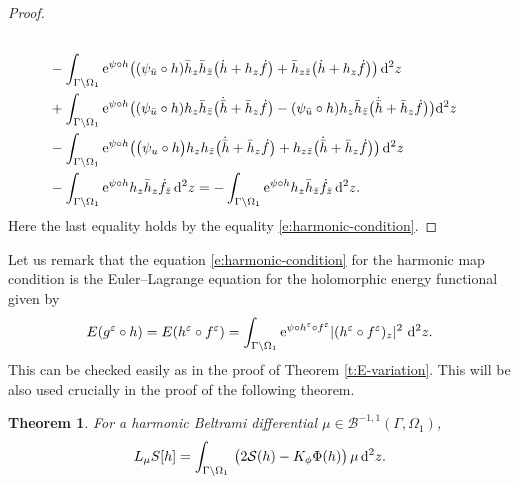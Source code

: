 \documentclass[pdftex]{sigma}%
\numberwithin{equation}{section}
\newtheorem{Theorem}{Theorem}[section]
\newcommand{\vep}{\varepsilon}
\begin{document}
\begin{proof}
\begin{align*}
\\
&-\int_{\Gamma\backslash \Omega_1}{\rm e}^{\psi\circ h} \big((\psi_{\bar{u}}\circ h) \bar{h}_z \bar{h}_{\bar{z}} \big(\dot{h}+h_z \dot{f} \big) + \bar{h}_{z\bar{z}} \big(\dot{h} +h_{z} \dot{f}\big)\big)\, {\rm d}^2z
\\
&+ \int_{\Gamma\backslash \Omega_1} {\rm e}^{\psi\circ h} \big( (\psi_{\bar{u}}\circ h)h_z \bar{h}_{\bar{z}} \big(\dot{\bar{h}}+\bar{h}_z \dot{f} \big) - (\psi_{\bar{u}}\circ h)h_z \bar{h}_{\bar{z}} \big(\dot{\bar{h}}+\bar{h}_z \dot{f} \big) \big) {\rm d}^2z
\\
&-\int_{\Gamma\backslash \Omega_1} {\rm e}^{\psi\circ h} \big( \big(\psi_{{u}}\circ h\big)h_z {h}_{\bar{z}} \big(\dot{\bar{h}}+\bar{h}_z \dot{f} \big)
+h_{z\bar{z}}\big(\dot{\bar{h}} +\bar{h}_{z} \dot{f}\big) \big)\, {\rm d}^2z
\\
&-\int_{\Gamma\backslash \Omega_1} {\rm e}^{\psi\circ h} h_z \bar{h}_{{z}} \dot{f}_{\bar{z}} \, {\rm d}^2z
=- \int_{\Gamma\backslash \Omega_1} {\rm e}^{\psi\circ h} h_z \bar{h}_{\bar{z}}\dot{f}_{\bar{z}} \, {\rm d}^2z.
\end{align*}
Here the last equality holds by the equality \eqref{e:harmonic-condition}.
\end{proof}

Let us remark that the equation \eqref{e:harmonic-condition} for the harmonic map condition is the Euler--Lagrange equation for the holomorphic energy functional given by
\begin{gather*}
E(g^\vep\circ h)=E(h^\vep\circ f^\vep) = \int_{\Gamma\backslash \Omega_1} {\rm e}^{\psi\circ h^\vep \circ f^\vep} |(h^\vep \circ f^\vep)_z|^2 \ {\rm d}^2z.
\end{gather*}
This can be checked easily as in the proof of Theorem \ref{t:E-variation}.
This will be also used crucially in the proof of the following theorem.

\begin{Theorem}\label{t:final-thm}
For a harmonic Beltrami differential $\mu\in\mathcal{B}^{-1,1}(\Gamma,\Omega_1)$,
\begin{gather}\label{e:variation-S-h}
L_\mu S[h] = \int_{\Gamma\backslash \Omega_1} \, \big(2\mathcal{S}(h) - K_\phi \Phi(h) \big)\, \mu \, {\rm d}^2z.
\end{gather}
\end{Theorem}
\end{document}
